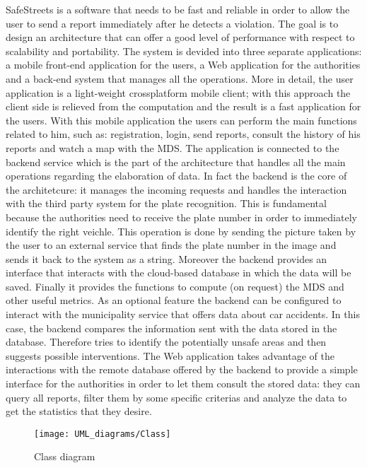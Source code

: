 SafeStreets is a software that needs to be fast and reliable in order to allow the user to send a report immediately after he detects a violation. The goal is to design an architecture that can offer a good level of performance with respect to scalability and portability. The system is devided into three separate applications: a mobile front-end application for the users, a Web application for the authorities and a back-end system that manages all the operations. More in detail, the user application is a light-weight crossplatform mobile client; with this approach the client side is relieved from the computation and the result is a fast application for the users. With this mobile application the users can perform the main functions related to him, such as: registration, login, send reports, consult the history of his reports and watch a map with the MDS. The application is connected to the backend service which is the part of the architecture that handles all the main operations regarding the elaboration of data. In fact the backend is the core of the architetcure: it manages the incoming requests and handles the interaction with the third party system for the plate recognition. This is fundamental because the authorities need to receive the plate number in order to immediately identify the right veichle. This operation is done by sending the picture taken by the user to an external service that finds the plate number in the image and sends it back to the system as a string. Moreover the backend provides an interface that interacts with the cloud-based database in which the data will be saved. Finally it provides the functions to compute (on request) the MDS and other useful metrics. As an optional feature the backend can be configured to interact with the municipality service that offers data about car accidents. In this case, the backend compares the information sent with the data stored in the database. Therefore tries to identify the potentially unsafe areas and then suggests possible interventions. The Web application takes advantage of the interactions with the remote database offered by the backend to provide a simple interface for the authorities in order to let them consult the stored data: they can query all reports, filter them by some specific criterias and analyze the data to get the statistics that they desire.
\begin{figure}[H]
    \centering
    \texttt{[image: UML\_diagrams/Class]}
    \caption{Class diagram}
    \label{fig:class_diagram}
\end{figure}
